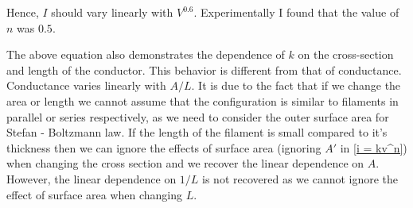 \documentclass[titlepage, a4paper, 11pt]{article}
\begin{document}
Hence, $I$ should vary linearly with $V^{0.6}$. Experimentally I found that the value of $n$ was
$0.5$.

The above equation also demonstrates the dependence of $k$ on the cross-section and length of the
conductor. This behavior is different from that of conductance. Conductance varies linearly with
$A/L$. It is due to the fact that if we change the area or length we cannot assume that
the configuration is similar to filaments in parallel or series respectively, as we need to
consider the outer surface area for Stefan - Boltzmann law. If the length of the filament is
small compared to it's thickness then we can ignore the effects of surface area (ignoring $A'$ in
\eqref{i = kv^n}) when changing the cross section and we recover the linear dependence on $A$.
However, the linear dependence on $1/L$ is not recovered as we cannot ignore the effect of surface
area when changing $L$.
\end{document}
